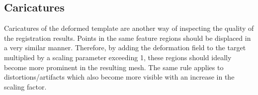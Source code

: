 \subsection{Caricatures}
Caricatures of the deformed template are another way of inspecting the quality of the registration results. Points in the same feature regions should be displaced in a very similar manner. Therefore, by adding the deformation field to the target multiplied by a scaling parameter exceeding 1, these regions should ideally become more prominent in the resulting mesh. The same rule applies to distortions/artifacts which also become more visible with an increase in the scaling factor.

\begin{figure}[h!]
    \centering
    \\
    \\
    \\

\end{figure}

